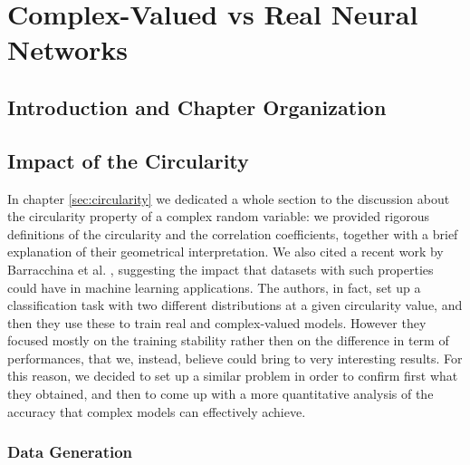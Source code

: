 \documentclass[../main.tex]{subfiles}
\begin{document}
	
\chapter{Complex-Valued vs Real Neural Networks}

\section*{Introduction and Chapter Organization}

\section{Impact of the Circularity}

In chapter \ref{sec:circularity} we dedicated a whole section to the discussion about the circularity property of a complex random variable: we provided rigorous definitions of the circularity and the correlation coefficients, together with a brief explanation of their geometrical interpretation. We also cited a recent work by Barracchina et al. \cite{barrachina2021complexvalued}, suggesting the impact that datasets with such properties could have in machine learning applications. The authors, in fact, set up a classification task with two different distributions at a given circularity value, and then they use these to train real and complex-valued models. However they focused mostly on the training stability rather then on the difference in term of performances, that we, instead, believe could bring to very interesting results. For this reason, we decided to set up a similar problem in order to confirm first what they obtained, and then to come up with a more quantitative analysis of the accuracy that complex models can effectively achieve.

\subsection*{Data Generation}
\end{document}
